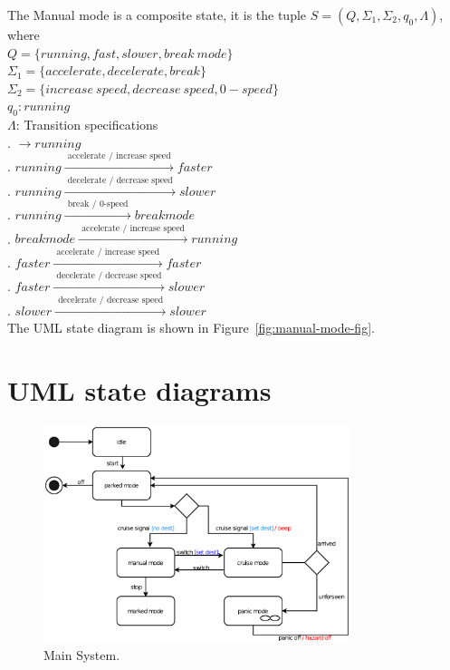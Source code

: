 \documentclass[12pt]{article}
\begin{document}
\begin{spacing}{1.5}
\noindent The Manual mode is a composite state, it is the tuple $S = (Q, \Sigma_1, \Sigma_2, q_0, \Lambda)$, where\\

\noindent $Q = \{running, fast, slower, break~mode\}$\\
\noindent $\Sigma_1 = \{accelerate, decelerate, break\}$\\
\noindent $\Sigma_2 = \{increase~speed, decrease~speed, 0-speed\}$\\
\noindent $q_0: running$\\
\noindent $\Lambda$: Transition specifications\\
. $\rightarrow running$\\
. $running \xrightarrow {\text { accelerate / increase speed }} faster$\\
. $running \xrightarrow {\text { decelerate / decrease speed }} slower$\\
. $running \xrightarrow {\text { break / 0-speed }} break mode$\\
. $break mode \xrightarrow {\text { accelerate / increase speed }} running$\\
. $faster \xrightarrow {\text { accelerate / increase speed }} faster$\\
. $faster \xrightarrow {\text { decelerate / decrease speed }} slower$\\
. $slower \xrightarrow {\text { decelerate / decrease speed }} slower$\\


\noindent The UML state diagram is shown in Figure~\ref{fig:manual-mode-fig}.

\newpage

\section{UML state diagrams}

\begin{figure}[h!]
	\centering
		\includegraphics[width=0.8\textwidth]{./A2_Figures/4.1-Main-System.eps}
		  \caption{Main System.}
  \label{fig:main-system-fig}
\end{figure}


\end{spacing}
\end{document}
